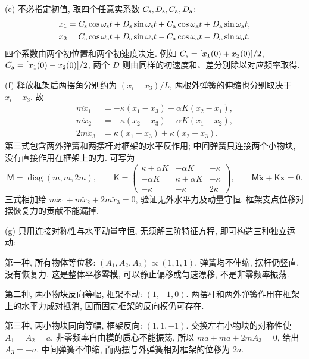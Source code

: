 \begin{solution}
(e) 不必指定初值, 取四个任意实系数 $C_{\rm s},D_{\rm s},C_{\rm a},D_{\rm a}$:
\begin{align*}
x_1&=C_{\rm s}\cos\omega_{\rm s}t+D_{\rm s}\sin\omega_{\rm s}t
+C_{\rm a}\cos\omega_{\rm a}t+D_{\rm a}\sin\omega_{\rm a}t,\\
x_2&=C_{\rm s}\cos\omega_{\rm s}t+D_{\rm s}\sin\omega_{\rm s}t
-C_{\rm a}\cos\omega_{\rm a}t-D_{\rm a}\sin\omega_{\rm a}t.
\end{align*}
四个系数由两个初位置和两个初速度决定. 例如 $C_{\rm s}=[x_1(0)+x_2(0)]/2$, $C_{\rm a}=[x_1(0)-x_2(0)]/2$, 两个 $D$ 则由同样的初速度和、差分别除以对应频率取得.

(f) 释放框架后两摆角分别约为 $(x_i-x_3)/L$, 两根外弹簧的伸缩也分别取决于 $x_i-x_3$. 故
\begin{align*}
m\ddot x_1&=-\kappa(x_1-x_3)+\alpha K(x_2-x_1),\\
m\ddot x_2&=-\kappa(x_2-x_3)+\alpha K(x_1-x_2),\\
2m\ddot x_3&=\kappa(x_1-x_3)+\kappa(x_2-x_3).
\end{align*}
第三式包含两外弹簧和两摆杆对框架的水平反作用; 中间弹簧只连接两个小物块, 没有直接作用在框架上的力. 可写为
\[
\mathsf M=\operatorname{diag}(m,m,2m),\qquad
\mathsf K=\begin{pmatrix}
\kappa+\alpha K&-\alpha K&-\kappa\\
-\alpha K&\kappa+\alpha K&-\kappa\\
-\kappa&-\kappa&2\kappa
\end{pmatrix},\qquad
\mathsf M\ddot{\boldsymbol x}+\mathsf K\boldsymbol x=0.
\]
三式相加给 $m\ddot x_1+m\ddot x_2+2m\ddot x_3=0$, 验证无外水平力及动量守恒. 框架支点位移对摆恢复力的贡献不能漏掉.

(g) 只用连接对称性与水平动量守恒, 无须解三阶特征方程, 即可构造三种独立运动:

第一种, 所有物体等位移: $(A_1,A_2,A_3)\propto(1,1,1)$. 弹簧均不伸缩, 摆杆仍竖直, 没有恢复力. 这是整体平移零模, 可以静止偏移或匀速漂移, 不是非零频率振荡.

第二种, 两小物块反向等幅, 框架不动: $(1,-1,0)$. 两摆杆和两外弹簧作用在框架上的水平力成对抵消, 因而固定框架的反向模仍可存在.

第三种, 两小物块同向等幅, 框架反向: $(1,1,-1)$. 交换左右小物块的对称性使 $A_1=A_2=a$. 非零频率自由模的质心不能振荡, 所以 $ma+ma+2mA_3=0$, 给出 $A_3=-a$. 中间弹簧不伸缩, 而两摆与外弹簧相对框架的位移为 $2a$.


\end{solution}
